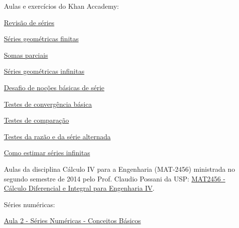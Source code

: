 Aulas e exercícios do Khan Accademy:
\begin{listlinks}
  \item \href{https://pt.khanacademy.org/math/calculus-home/series-calc/series-calculus/v/sigma-notation-sum                            }{Revisão de séries                   }
  \item \href{https://pt.khanacademy.org/math/calculus-home/series-calc/finite-geometric-series-calc/v/series-as-sum-of-sequence        }{Séries geométricas finitas          }
  \item \href{https://pt.khanacademy.org/math/calculus-home/series-calc/partial-sums-calc/v/partial-sum-notation                        }{Somas parciais                      }
  \item \href{https://pt.khanacademy.org/math/calculus-home/series-calc/geo-series-calc/v/evaluating-infinite-geometric-series          }{Séries geométricas infinitas        }
  \item \href{https://pt.khanacademy.org/math/calculus-home/series-calc/series-basics-challenge/v/telescoping-series                    }{Desafio de noções básicas de série  }
  \item \href{https://pt.khanacademy.org/math/calculus-home/series-calc/basic-convergence-tests-calc/v/divergence-test                  }{Testes de convergência básica       }
  \item \href{https://pt.khanacademy.org/math/calculus-home/series-calc/convergence-divergence-tests-calc/v/comparison-test             }{Testes de comparação                }
  \item \href{https://pt.khanacademy.org/math/calculus-home/series-calc/ratio-and-alternating-series-tests-calc/v/ratio-test-convergence}{Testes da razão e da série alternada}
  \item \href{https://pt.khanacademy.org/math/calculus-home/series-calc/estimating-infinite-series-calc/v/integrals-estimating-p-series }{Como estimar séries infinitas       }
\end{listlinks}

Aulas da disciplina Cálculo IV para a Engenharia (MAT-2456)
ministrada no segundo semestre de 2014 pelo Prof. Claudio Possani da USP:
\href{https://www.youtube.com/playlist?list=PLxI8Can9yAHeOiMYCBlkyCALloROQ58OY}%
     {MAT2456 - Cálculo Diferencial e Integral para Engenharia IV}.

Séries numéricas:
\begin{listlinks}
  \item \href{https://www.youtube.com/watch?v=8MjfOpAINUk&list=PLxI8Can9yAHeOiMYCBlkyCALloROQ58OY&index=9&t=0s}{Aula 2 - Séries Numéricas - Conceitos Básicos}
\end{listlinks}

